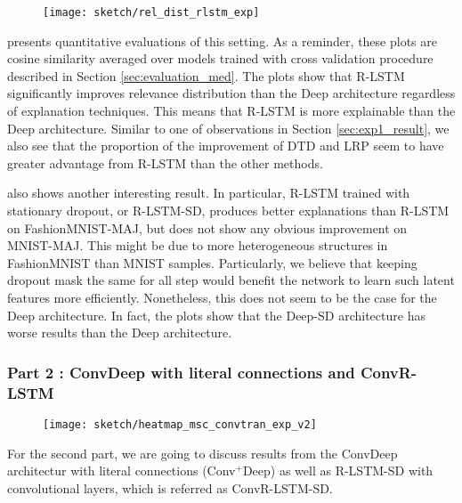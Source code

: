  \begin{figure}[!htb]
\centering
\texttt{[image: sketch/rel\_dist\_rlstm\_exp]}

\label{fig:rel_dist_rlstm_exp}
\end{figure}

\addfigure{\ref{fig:rel_dist_rlstm_exp}} presents quantitative evaluations of this setting. As a reminder, these plots are cosine similarity averaged over models trained with cross validation procedure described in  Section \ref{sec:evaluation_med}. The plots show that R-LSTM significantly improves relevance distribution than the Deep architecture regardless of explanation techniques.  This means that R-LSTM is more explainable than the Deep architecture. Similar to one of observations in Section \ref{sec:exp1_result}, we also see that the proportion of the improvement of DTD and LRP seem to have greater advantage from R-LSTM than the other methods.  

\addfigure{\ref{fig:rel_dist_rlstm_exp}}  also shows another interesting result. In particular, R-LSTM trained with stationary dropout, or R-LSTM-SD, produces better explanations than R-LSTM on FashionMNIST-MAJ, but does not show any obvious improvement on MNIST-MAJ. This might be due to more heterogeneous structures in FashionMNIST than MNIST samples. Particularly, we believe that  keeping dropout mask the same for all step would benefit the network to  learn such latent features more efficiently. Nonetheless, this does not seem to be the case for the Deep architecture. In fact, the plots show that the Deep-SD architecture has worse results than the Deep architecture.

\clearpage

\subsubsection{Part 2 : ConvDeep with literal connections and ConvR-LSTM}
 \begin{figure}[!htb]
\centering
\texttt{[image: sketch/heatmap\_msc\_convtran\_exp\_v2]}
\label{fig:heatmap_msc_convtran_exp}
\end{figure}
For the second part, we are going to discuss results from the ConvDeep architectur with literal connections (Conv$^+$Deep) as well as R-LSTM-SD with convolutional layers, which is referred as ConvR-LSTM-SD. 

